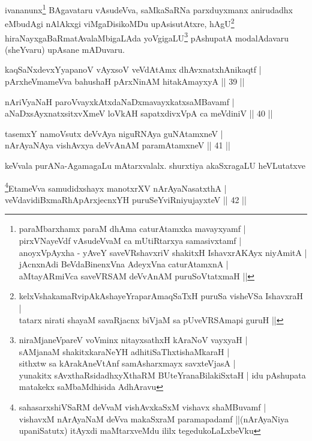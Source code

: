 \begin{artha}%
ivananunx\footnote{paraMbarxhamx paraM dhAma caturAtamxka mavayxyamf |\\
pirxVNayeVdf vAsudeVvaM ca mUtiRtarxya samasivxtamf |\\
anoyxVpAyxha - yAveY saveVRshavxriV shakitxH IshavxrAKAyx niyAmitA |\\
jAcnxnAdi BeVdaBinenxVna AdeyxVna caturAtamxnA |\\
aMtayARmiVca saveVRSAM deVvAnAM puruSoVtatxmaH ||} BAgavataru vAsudeVva, saMkaSaRNa parxduyxmanx anirudadhx eMbudAgi nAlAkxgi viMgaDisikoMDu upAsisutAtxre, hAgU\footnote{kelxVshakamaRvipAkAshayeYraparAmaqSaTxH puruSa visheVSa IshavxraH |\\tatarx nirati shayaM savaRjacnx biVjaM sa pUveVRSAmapi guruH ||} hiraNayxgaBaRmatAvalaMbigaLAda yoVgigaLU\footnote{niraMjaneVpareV voVminx nitayxsathxH kAraNoV vayxyaH |\\
sAMjanaM shakitxkaraNeYH adhitiSaThxtishaMkaraH |\\
sithxtw sa kArakAneVtAnf samAsharxmayx savxteVjasA | \\
yunakitx sAvxthaRsidadhxyXthaRM BUteYranaBilakiSxtaH | idu pAshupata matakekx saMbaMdhisida AdhAravu} pAshupatA modalAdavaru (sheYvaru) upAsane mADuvaru.
\end{artha}

\begin{shl}
kaqSaNxdevxYyapanoV vAyxsoV veVdAtAmx dhAvxnatxhAnikaqtf |\\
pArxheVmameVva bahushaH pArxNinAM hitakAmayxyA \hfill || 39 ||
\end{shl}

\begin{shl}
nAriVyaNaH paroV\s vayxkAtxdaNaDxmavayxkatxsaMBavamf |\\
aNaDxsAyxnatxsitxvXmeV loVkAH sapatxdivxVpA ca meVdiniV \hfill || 40 ||
\end{shl}

\begin{shl}
tasemxY namoV\s sutx deVvAya niguRNAya guNAtamxneV |\\
nArAyaNAya vishAvxya deVvAnAM paramAtamxneV \hfill || 41 ||
\end{shl}

\begin{artha}
keVvala purANa-AgamagaLu mAtarxvalalx. shurxtiya akaSxragaLU heVLutatxve
\end{artha}

\begin{shl}
\footnote{sahasarxshiVSaRM deVvaM vishAvxkaSxM vishavx shaMBuvamf |\\
vishavxM nArAyaNaM deVva makaSxraM paramapadamf ||(nArAyaNiya upaniSatutx) itAyxdi maMtarxveMdu ililx tegedukoLaLxbeVku}EtameVva samudidxshayx manotxrXV nArAyaNasatxthA |\\
veVdavidiBxmaRhApArxjecnxYH puruSeYviRniyujayxteV \hfill || 42 ||
\end{shl}

